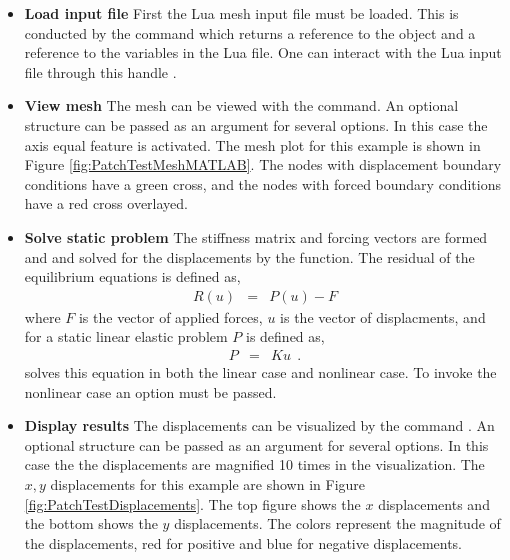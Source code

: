 \begin{itemize}

  \item{\textbf{Load input file}}
  First the Lua mesh input file must be loaded.
  This is conducted by the  command
  which returns a reference to the  object 
  and a reference to the variables in the Lua file. 
  One can interact with the Lua input file through 
  this handle .

  \item{\textbf{View mesh}}
  The mesh can be viewed with the  command. 
  An optional structure  can be passed as
  an argument for several options. In this case the
  axis equal feature is activated. 
  The mesh plot for this example
  is shown in Figure \ref{fig:PatchTestMeshMATLAB}. The
  nodes with displacement boundary conditions have a green cross,
  and the nodes with forced boundary conditions have a red cross
  overlayed. 

  \item{\textbf{Solve static problem}}
  The stiffness matrix and forcing vectors are formed and
  and solved for the displacements by the 
  function. The residual of the equilibrium equations is 
  defined as,
  \begin{eqnarray}
  R(u) &=& P(u) - F
  \end{eqnarray}
  where $F$ is the vector of applied forces, $u$
  is the vector of displacments, and for a static
  linear elastic problem $P$ is defined as,
  \begin{eqnarray}
  P   &=& K u~~.
  \end{eqnarray}
   solves this equation in both the
  linear case and nonlinear case. To invoke the nonlinear 
  case an option must be passed.

  \item{\textbf{Display results}}
  The displacements can be visualized by the command 
  .
  An optional structure  can be passed as
  an argument for several options. In this case the
  the displacements are magnified 10 times in the 
  visualization.  
  The $x,y$ displacements for this example
  are shown in Figure \ref{fig:PatchTestDisplacements}. The
  top figure shows the $x$ displacements and the bottom shows
  the $y$ displacements. The colors represent the magnitude
  of the displacements, red for positive and blue for negative
  displacements.

\end{itemize}

